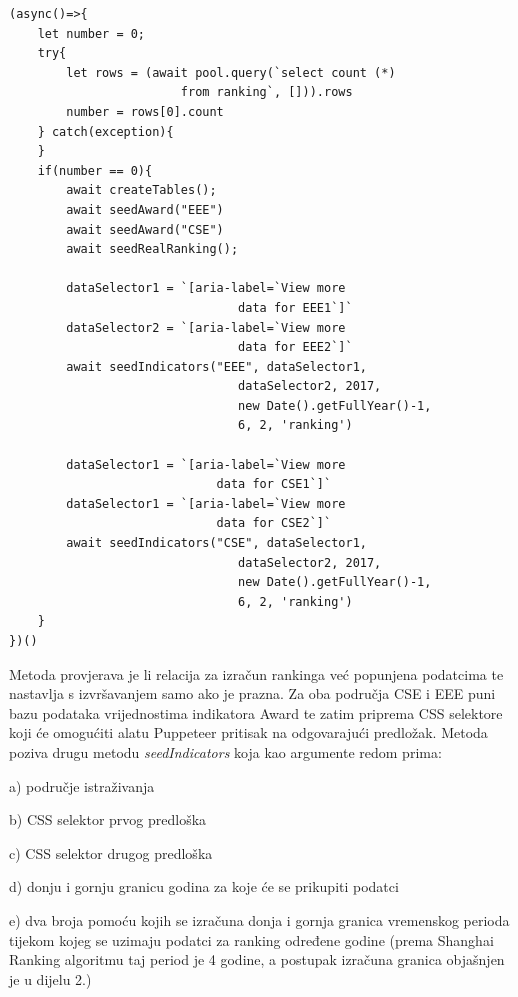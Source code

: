 \documentclass[times, utf8, zavrsni]{fer}
\begin{document}
\begin{lstlisting}  
(async()=>{
    let number = 0;
    try{
        let rows = (await pool.query(`select count (*) 
                        from ranking`, [])).rows
        number = rows[0].count
    } catch(exception){
    }
    if(number == 0){
        await createTables();
        await seedAward("EEE")
        await seedAward("CSE")
        await seedRealRanking();
            
        dataSelector1 = `[aria-label=`View more 
                                data for EEE1`]`
        dataSelector2 = `[aria-label=`View more 
                                data for EEE2`]`
        await seedIndicators("EEE", dataSelector1, 
                                dataSelector2, 2017, 
                                new Date().getFullYear()-1, 
                                6, 2, 'ranking')
    
        dataSelector1 = `[aria-label=`View more
                             data for CSE1`]`
        dataSelector1 = `[aria-label=`View more
                             data for CSE2`]`
        await seedIndicators("CSE", dataSelector1, 
                                dataSelector2, 2017, 
                                new Date().getFullYear()-1,
                                6, 2, 'ranking')
    }
})()
\end{lstlisting}    
Metoda provjerava je li relacija za izračun rankinga već popunjena podatcima te nastavlja s izvršavanjem samo ako je prazna. 
Za oba područja CSE i EEE puni bazu podataka vrijednostima indikatora Award te zatim priprema CSS selektore koji će omogućiti alatu 
Puppeteer pritisak na odgovarajući predložak. Metoda poziva drugu metodu \emph{seedIndicators} koja kao argumente redom prima:

    a) područje istraživanja
    
    b) CSS selektor prvog predloška 

    c) CSS selektor drugog predloška
    
    d) donju i gornju granicu godina za koje će se prikupiti podatci
    
    e) dva broja pomoću kojih se izračuna donja i gornja granica vremenskog perioda tijekom kojeg se uzimaju podatci za ranking određene godine
        (prema Shanghai Ranking algoritmu taj period je 4 godine, a postupak izračuna granica objašnjen je u dijelu 2.)
      
\end{document}

